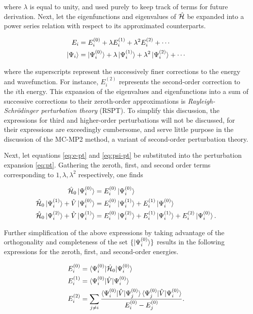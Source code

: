 \noindent where $\lambda$ is equal to unity, and used purely to keep track of
terms for future derivation. Next, let the eigenfunctions and eigenvalues of
$\hat{\mathcal{H}}$ be expanded into a power series relation with respect to its
approximated counterparts.

\begin{align}
	\label{eq:e-pt}
	E_i &= E^{(0)}_i + \lambda E^{(1)}_i + \lambda^2 E^{(2)}_i + \cdots \\
	\label{eq:psi-pt}
	\ket{\Psi_i} &= \ket{\Psi^{(0)}_i} + \lambda \ket{\Psi^{(1)}_i} + \lambda^2 \ket{\Psi^{(2)}_i} + \cdots
\end{align}

\noindent where the superscripts represent the successively finer corrections to
the energy and wavefunction. For instance, $E_i^{(2)}$ represents the
second-order correction to the $i$th energy. This expansion of the eigenvalues
and eigenfunctions into a sum of successive corrections to their zeroth-order
approximations is \emph{Rayleigh-Schr{\"o}dinger perturbation theory} (RSPT). To
simplify this discussion, the expressions for third and higher-order
perturbations will not be discussed, for their expressions are exceedingly
cumbersome, and serve little purpose in the discussion of the MC-MP2 method, a
variant of second-order perturbation theory.

Next, let equations \ref{eq:e-pt} and \ref{eq:psi-pt} be substituted into the
perturbation expansion \ref{eq:pt}. Gathering the zeroth, first, and second
order terms corresponding to $1, \lambda, \lambda^2$ respectively, one finds

\begin{align}
	\hat{\mathcal{H}}_0 \ket{\Psi_{i}^{(0)}} &= E^{(0)}_{i} \ket{\Psi_{i}^{(0)}} \\
	\hat{\mathcal{H}}_0 \ket{\Psi_{i}^{(1)}} + \hat V \ket{\Psi_{i}^{(0)}}
				&= E^{(0)}_{i} \ket{\Psi_{i}^{(1)}} + E^{(1)}_{i} \ket{\Psi_{i}^{(0)}} \\
	\hat{\mathcal{H}}_0 \ket{\Psi_{i}^{(2)}} + \hat V \ket{\Psi_{i}^{(1)}}
				&= E^{(0)}_{i} \ket{\Psi_{i}^{(2)}} + E^{(1)}_{i} \ket{\Psi_{i}^{(1)}} + E^{(2)}_{i} \ket{\Psi_{i}^{(0)}}.
\end{align}

Further simplification of the above expressions by taking advantage of the
orthogonality and completeness of the set $\{\ket{\Psi_{i}^{(0)}}\}$ results in the
following expressions for the zeroth, first, and second-order energies.

\begin{align}
	\perturbE{0} &= \braket{\Psi_i^{(0)} | \hamil_0 | \Psi_i^{(0)}} \\
	\perturbE{1} &= \braket{\Psi_i^{(0)} | \hat V | \Psi_i^{(0)}} \\
	\label{eq:rspt-2}
	\perturbE{2} &= \sum_{j \neq i}
	\frac{\braket{\Psi_i^{(0)} | \hat V | \Psi_j^{(0)}} \braket{\Psi_j^{(0)} | \hat V | \Psi_i^{(0)}}}
	{\perturbE[i]{0} - \perturbE[j]{0}}.
\end{align}


